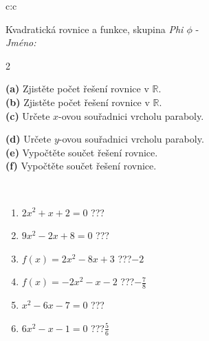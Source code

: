 \documentclass[10pt]{report}
\begin{document}
\begin{tabular}{c:c}
\begin{minipage}[c][104.5mm][t]{0.5\linewidth}
\begin{center}
\vspace{7mm}
{\huge \LARGE Kvadratická rovnice a funkce, skupina \textit{Phi $\phi$} -}\\[5mm]
\textit{Jméno:}\phantom{xxxxxxxxxxxxxxxxxxxxxxxxxxxxxxxxxxxxxxxxxxxxxxxxxxxxxxxxxxxxxxxxx}\\[5mm]
\begin{minipage}{0.95\linewidth}
\begin{center}
{\small \begin{multicols}{2} \raggedright
\textbf{(a)} Zjistěte počet řešení rovnice v \(\mathbb{R}\). \\[1mm]
\textbf{(b)} Zjistěte počet řešení rovnice v \(\mathbb{R}\). \\[1mm]
\textbf{(c)} Určete \(x\)-ovou souřadnici vrcholu paraboly. \par \columnbreak
\textbf{(d)} Určete \(y\)-ovou souřadnici vrcholu paraboly. \\[1mm]
\textbf{(e)} Vypočtěte součet řešení rovnice. \\[1mm]
\textbf{(f)} Vypočtěte součet řešení rovnice.
\end{multicols}
}
\end{center}
\end{minipage}
\\[4mm]
\begin{minipage}{0.79\linewidth}
\begin{center}
\begin{varwidth}{\linewidth}
\begin{enumerate}
\Large
\item $2x^2+x+2=0$\quad \dotfill\; ???\;\dotfill {}
\item $9x^2-2x+8=0$\quad \dotfill\; ???\;\dotfill {}
\item $f(x)=2x^2-8x+3$\quad \dotfill\; ???\;\dotfill \quad $-2$
\item $f(x)=-2x^2-x-2$\quad \dotfill\; ???\;\dotfill \quad $-\frac{7}{8}$
\item $x^2-6x-7=0$\quad \dotfill\; ???\;\dotfill {}
\item $6x^2-x-1=0$\quad \dotfill\; ???\;\dotfill \quad $\frac{5}{6}$
\end{enumerate}
\end{varwidth}
\end{center}
\end{minipage}

\end{center}
\end{minipage}
\end{tabular}
\end{document}

